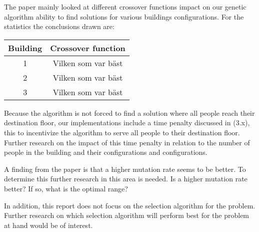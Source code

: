 The paper mainly looked at different crossover functions impact on our genetic algorithm ability to find solutions for various buildings configurations. For the statistics the conclusions drawn are:

\begin{center}
	\begin{tabular}{|c|c|}
		\hline
		Building & Crossover function  \\ \hline
		1        & Vilken som var bäst \\ \hline
		2        & Vilken som var bäst \\ \hline
		3        & Vilken som var bäst \\ \hline
	\end{tabular}
\end{center}
Because the algorithm is not forced to find a solution where all people reach their destination floor, our implementations include a time penalty discussed in (3.x), this to incentivize the algorithm to serve all people to their destination floor. Further research on the impact of this time penalty in relation to the number of people in the building and their configurations and configurations.

A finding from the paper is that a higher mutation rate seems to be better. To determine this further research in this area is needed. Is a higher mutation rate better? If so, what is the optimal range?

In addition, this report does not focus on the selection algorithm for the problem. Further research on which selection algorithm will perform best for the problem at hand would be of interest.
